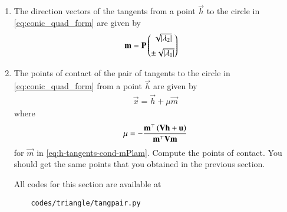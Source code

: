 \begin{enumerate}[label=\thesubsection.\arabic*.,ref=\thesubsection.\theenumi]
\item
	The direction vectors of the tangents from a point 
$\vec{h}$ to the circle in \eqref{eq:conic_quad_form} are given by  
\begin{align}
  \mathbf{m}&= \mathbf{P}\begin{pmatrix}\sqrt{\left\vert\lambda_2\right\vert} \\[2mm]  \pm \sqrt{\left\vert\lambda_1\right\vert}\end{pmatrix}
	  \label{eq:h-tangents-cond-mPlam}
\end{align}
\item The points of contact of the pair 
of tangents 
to the circle in \eqref{eq:conic_quad_form} 
	from 
	a point $\vec{h}$ 
	are given by 
  \begin{align}
  \label{eq:line_dir_pt-lam}
	  \vec{x}  = \vec{h} + \mu \vec{m}
  \end{align}
  where 
  \begin{align}
  \label{eq:line_dir_pt-lam-mu}
	  \mu = -\frac{\mathbf{m}^{\top}\left(\mathbf{V}\mathbf{h}+\mathbf{u}\right)}{\mathbf{m}^{\top}\mathbf{V}\mathbf{m} }
  \end{align}
	for $\vec{m}$ in 
	  \eqref{eq:h-tangents-cond-mPlam}.
  Compute the points of contact. You should get the same points that you obtained in the previous section. 

All codes for this section are available at
\begin{lstlisting}
	codes/triangle/tangpair.py
\end{lstlisting}
\end{enumerate}
